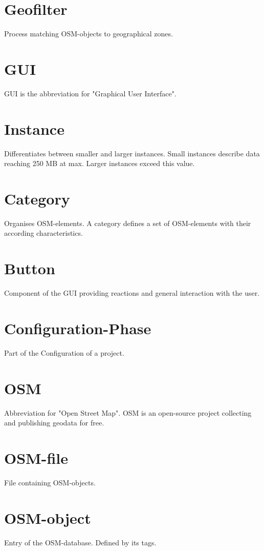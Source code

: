 \documentclass[parskip=full]{report} %
\begin{document}
\section*{Geofilter}
Process matching OSM-objects to geographical zones.

\section*{GUI}
GUI is the abbreviation for "Graphical User Interface".

\section*{Instance}
Differentiates between smaller and larger instances. Small instances describe data reaching 250 MB at max. Larger instances exceed this value.

\section*{Category}
Organises OSM-elements. A category defines a set of OSM-elements with their according characteristics.

\section*{Button}
Component of the GUI providing reactions and general interaction with the user.

\section*{Configuration-Phase}
Part of the Configuration of a project.

\section*{OSM}
Abbreviation for "Open Street Map". OSM is an open-source project collecting and publishing geodata for free.

\section*{OSM-file}
File containing OSM-objects.

\section*{OSM-object}
Entry of the OSM-database. Defined by its tags.
\end{document}
